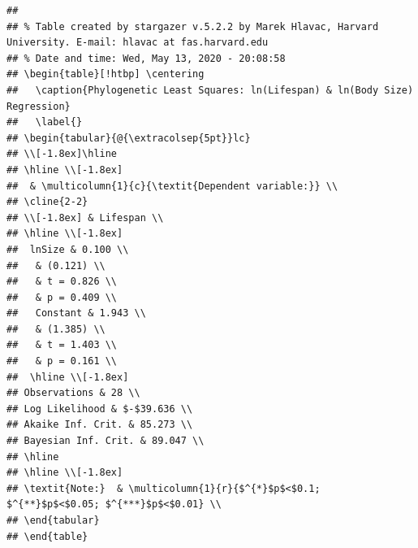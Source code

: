 \documentclass[10pt,letterpaper]{article}
\begin{document}
\begin{verbatim}
## 
## % Table created by stargazer v.5.2.2 by Marek Hlavac, Harvard University. E-mail: hlavac at fas.harvard.edu
## % Date and time: Wed, May 13, 2020 - 20:08:58
## \begin{table}[!htbp] \centering 
##   \caption{Phylogenetic Least Squares: ln(Lifespan) & ln(Body Size) Regression} 
##   \label{} 
## \begin{tabular}{@{\extracolsep{5pt}}lc} 
## \\[-1.8ex]\hline 
## \hline \\[-1.8ex] 
##  & \multicolumn{1}{c}{\textit{Dependent variable:}} \\ 
## \cline{2-2} 
## \\[-1.8ex] & Lifespan \\ 
## \hline \\[-1.8ex] 
##  lnSize & 0.100 \\ 
##   & (0.121) \\ 
##   & t = 0.826 \\ 
##   & p = 0.409 \\ 
##   Constant & 1.943 \\ 
##   & (1.385) \\ 
##   & t = 1.403 \\ 
##   & p = 0.161 \\ 
##  \hline \\[-1.8ex] 
## Observations & 28 \\ 
## Log Likelihood & $-$39.636 \\ 
## Akaike Inf. Crit. & 85.273 \\ 
## Bayesian Inf. Crit. & 89.047 \\ 
## \hline 
## \hline \\[-1.8ex] 
## \textit{Note:}  & \multicolumn{1}{r}{$^{*}$p$<$0.1; $^{**}$p$<$0.05; $^{***}$p$<$0.01} \\ 
## \end{tabular} 
## \end{table}
\end{verbatim}
\end{document}
